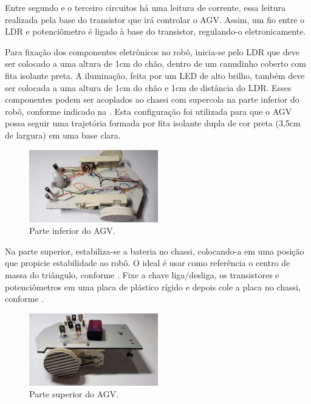 \documentclass{textolivre-html}
\begin{document}
Entre segundo e o terceiro circuitos há uma leitura de corrente, essa leitura
realizada pela base do transistor que irá controlar o AGV. Assim, um fio entre
o LDR e potenciômetro é ligado à base do transistor, regulando-o
eletronicamente.

Para fixação dos componentes eletrônicos no robô, inicia-se pelo LDR que deve
ser colocado a uma altura de 1cm do chão, dentro de um canudinho coberto com
fita isolante preta. A iluminação, feita por um LED de alto brilho, também deve
ser colocada a uma altura de 1cm do chão e 1cm de distância do LDR. Esses
componentes podem ser acoplados ao chassi com supercola na parte inferior do
robô, conforme indicado na . Esta configuração foi utilizada para que
o AGV possa seguir uma trajetória formada por fita isolante dupla de cor preta
(3,5cm de largura) em uma base clara.

\begin{figure}[h!]
\centering
\includegraphics[width=0.5\textwidth]{figure-20.pdf}
\caption{Parte inferior do AGV.}
\label{fig14}
\end{figure}

Na parte superior, estabiliza-se a bateria no chassi, colocando-a em uma
posição que propicie estabilidade ao robô. O ideal é usar como referência o
centro de massa do triângulo, conforme . Fixe a chave liga/desliga, os
transistores e potenciômetros em uma placa de plástico rígido e depois cole a
placa no chassi, conforme .

\begin{figure}[H]
\centering
\includegraphics[width=0.5\textwidth]{figure-21.pdf}
\caption{Parte superior do AGV.}
\label{fig15}
\end{figure}
\end{document}
